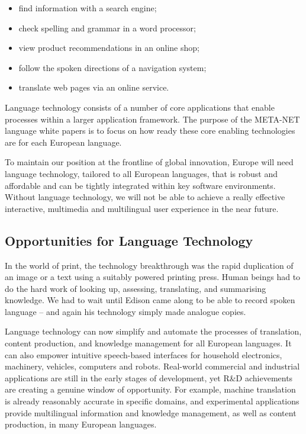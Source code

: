 \documentclass[]{../metanetpaper}
\begin{document}
\begin{multicols}{2}
\begin{itemize}
\item find information with a search engine;
\item check spelling and grammar in a word processor;
\item view product recommendations in an online shop;
\item follow the spoken directions of a navigation system;
\item translate web pages via an online service.
\end{itemize}

Language technology consists of a number of core applications that enable processes within a larger application framework. The purpose of the META-NET language white papers is to focus on how ready these core enabling technologies are for each European language. 


To maintain our position at the frontline of global innovation, Europe will need language technology, tailored to all European languages, that is robust and affordable and can be tightly integrated within key software environments. Without language technology, we will not be able to achieve a really effective interactive, multimedia and multilingual user experience in the near future.

\subsection{Opportunities for Language Technology}

In the world of print, the technology breakthrough was the rapid duplication of an image or a text using a suitably powered printing press. Human beings had to do the hard work of looking up, assessing, translating, and summarising knowledge. We had to wait until Edison came along to be able to record spoken language – and again his technology simply made analogue copies.

Language technology can now simplify and automate the processes of translation, content production, and knowledge management for all European languages. It can also empower intuitive speech-based interfaces for household electronics, machinery, vehicles, computers and robots. Real-world commercial and industrial applications are still in the early stages of development, yet R\&D achievements are creating a genuine window of opportunity. For example, machine translation is already reasonably accurate in specific domains, and experimental applications provide multilingual information and knowledge management, as well as content production, in many European languages. 


\end{multicols}
\end{document}
